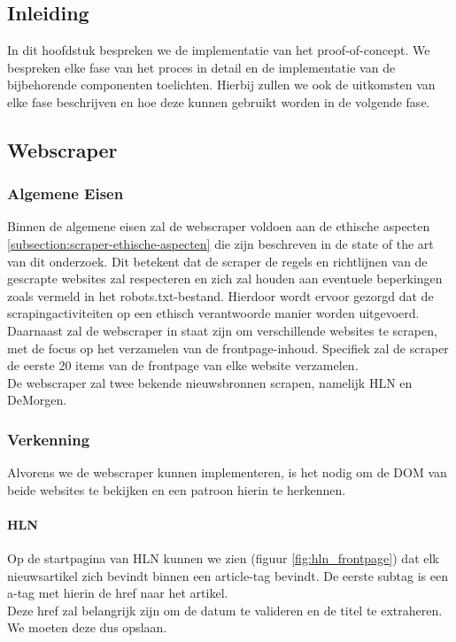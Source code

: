 \chapter{}%
\label{ch:proof-of-concept}
\section{Inleiding}
In dit hoofdstuk bespreken we de implementatie van het proof-of-concept. We bespreken elke fase van het proces in detail en de implementatie van de bijbehorende componenten toelichten. Hierbij zullen we ook de uitkomsten van elke fase beschrijven en hoe deze kunnen gebruikt worden in de volgende fase. \\

\section{Webscraper}
\subsection{Algemene Eisen}
Binnen de algemene eisen zal de webscraper voldoen aan de ethische aspecten \ref{subsection:scraper-ethische-aspecten} die zijn beschreven in de state of the art van dit onderzoek. Dit betekent dat de scraper de regels en richtlijnen van de gescrapte websites zal respecteren en zich zal houden aan eventuele beperkingen zoals vermeld in het robots.txt-bestand. Hierdoor wordt ervoor gezorgd dat de scrapingactiviteiten op een ethisch verantwoorde manier worden uitgevoerd. \\

Daarnaast zal de webscraper in staat zijn om verschillende websites te scrapen, met de focus op het verzamelen van de frontpage-inhoud. Specifiek zal de scraper de eerste 20 items van de frontpage van elke website verzamelen. \\

De webscraper zal twee bekende nieuwsbronnen scrapen, namelijk HLN en DeMorgen.

\subsection{Verkenning}
Alvorens we de webscraper kunnen implementeren, is het nodig om de DOM van beide websites te bekijken en een patroon hierin te herkennen. \\
\subsubsection{HLN}
Op de startpagina van HLN kunnen we zien (figuur \ref{fig:hln_frontpage}) dat elk nieuwsartikel zich bevindt binnen een article-tag bevindt. De eerste subtag is een a-tag met hierin de href naar het artikel. \\ Deze href zal belangrijk zijn om de datum te valideren en de titel te extraheren. We moeten deze dus opslaan. 

